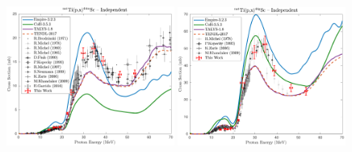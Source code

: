 \begin{figure}
  \includegraphics[width=0.49\textwidth]{./figures/44mSc.pdf}
 \includegraphics[width=0.49\textwidth]{./figures/44gSc.pdf}


\vspace{-20pt} 
\end{figure}


